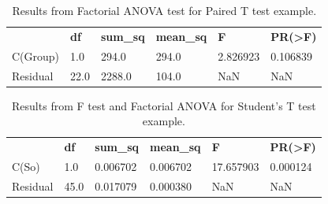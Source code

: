 {\begin{table}[htpb]
  \begin{center}
    \caption{Results from Factorial ANOVA test for Paired T test example.}
    \begin{tabularx}{\linewidth}{XXXXXX}
       & \textbf{df} & \textbf{sum\_sq} & \textbf{mean\_sq} & \textbf{F} & \textbf{PR(>F)} \\
        C(Group) &  1.0 &  294.0  &  294.0 & 2.826923 & 0.106839 \\
        Residual & 22.0 & 2288.0  &  104.0    &   NaN   &    NaN \\
    \end{tabularx}
  \end{center}
  \label{tab:paired_t_fanova}
\end{table}


\begin{table}[htpb]
  \begin{center}
    \caption{Results from F test and Factorial ANOVA for Student's T test example.}
    \begin{tabularx}{\linewidth}{XXXXXX}
       & \textbf{df} & \textbf{sum\_sq} & \textbf{mean\_sq} & \textbf{F} & \textbf{PR(>F)} \\
        C(So)   &   1.0 &  0.006702 &  0.006702 & 17.657903 & 0.000124 \\
        Residual & 45.0 & 0.017079 & 0.000380    &    NaN     &  NaN \\
    \end{tabularx}
  \end{center}
  \label{tab:students_t_f_test_and_fanova}
\end{table}
}

\lstset{
  style=tea,
  columns=flexible,
  showstringspaces=false,
  numbers=left,
  xleftmargin=2em,
  numberstyle=\tiny,
  escapechar=|,
}


